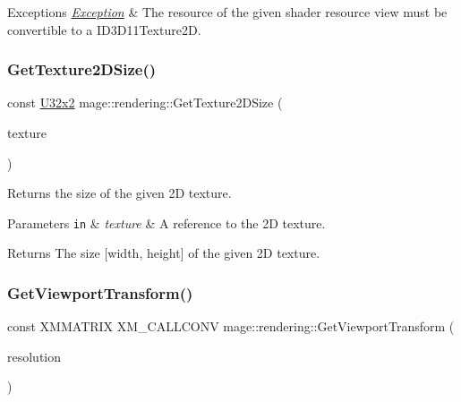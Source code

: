 \begin{DoxyExceptions}{Exceptions}
{\em \mbox{\hyperlink{classmage_1_1_exception}{Exception}}} & The resource of the given shader resource view must be convertible to a {\ttfamily I\+D3\+D11\+Texture2D}. \\
\hline
\end{DoxyExceptions}
\mbox{\label{namespacemage_1_1rendering_adc5168157e810238c5748766cd03dde9}} 
\subsubsection{\texorpdfstring{Get\+Texture2\+D\+Size()}{GetTexture2DSize()}\hspace{0.1cm}{\footnotesize\ttfamily [2/2]}}
{\footnotesize\ttfamily const \mbox{\hyperlink{namespacemage_ae5e7ccf8a1785baaacf57b3a0f4324e2}{U32x2}} mage\+::rendering\+::\+Get\+Texture2\+D\+Size (\begin{DoxyParamCaption}\item[{I\+D3\+D11\+Texture2D \&}]{texture }\end{DoxyParamCaption})\hspace{0.3cm}{\ttfamily [noexcept]}}

Returns the size of the given 2D texture.


\begin{DoxyParams}[1]{Parameters}
\mbox{\tt in}  & {\em texture} & A reference to the 2D texture. \\
\hline
\end{DoxyParams}
\begin{DoxyReturn}{Returns}
The size \mbox{[}width, height\mbox{]} of the given 2D texture. 
\end{DoxyReturn}
\mbox{\label{namespacemage_1_1rendering_a82d538281695508a371a9a0cd039d782}} 
\subsubsection{\texorpdfstring{Get\+Viewport\+Transform()}{GetViewportTransform()}}
{\footnotesize\ttfamily const X\+M\+M\+A\+T\+R\+IX X\+M\+\_\+\+C\+A\+L\+L\+C\+O\+NV mage\+::rendering\+::\+Get\+Viewport\+Transform (\begin{DoxyParamCaption}\item[{const \mbox{\hyperlink{namespacemage_ae5e7ccf8a1785baaacf57b3a0f4324e2}{U32x2}} \&}]{resolution }\end{DoxyParamCaption})\hspace{0.3cm}{\ttfamily [noexcept]}}


